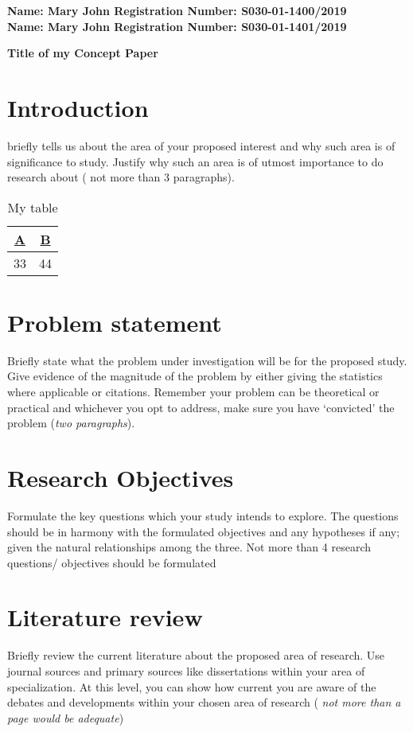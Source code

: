 \documentclass[twoside,a4paper,12pt]{article}
\begin{document}
	
	\begin{flushleft} 
			\large{\bf{Name: Mary John       Registration Number: S030-01-1400/2019\\
					   Name: Mary John       Registration Number: S030-01-1401/2019\\}} \vspace*{0.75in}
	\end{flushleft}
	
	\begin{center} \Large{ \bf{Title of my Concept Paper}} \end{center}	


\section*{Introduction} briefly tells us about the area of your proposed interest and why such area is of significance to study. Justify why such an area is of utmost importance to do research about ( not more than 3 paragraphs).
\begin{table}[htb]\centering
	\caption{My table}
	\begin{tabular}{||c||c||}
		\hline
		\textbf{\underline{A}} & \textbf{\underline{B}} \\
		\hline
		33 & 44 \\
		\hline
	\end{tabular}
\end{table}



\section*{Problem statement} Briefly state what the problem under investigation will be for the proposed study. Give evidence of the magnitude of the problem by either giving the statistics where applicable or citations. Remember your problem can be theoretical or practical and whichever you opt to address, make sure you have ‘convicted’ the problem (\textit{two paragraphs}).
\section*{Research Objectives} Formulate the key questions which your study intends to explore. The questions should be in harmony with the formulated objectives and any hypotheses if any; given the natural relationships among the three. Not more than 4 research questions/ objectives should be formulated
\section*{Literature review} Briefly review the current literature about the proposed area of research. Use journal sources and primary sources like dissertations within your area of specialization. At this level, you can show how current you are aware of the debates and developments within your chosen area of research ( \emph{not more than a page would be adequate})
\end{document}
